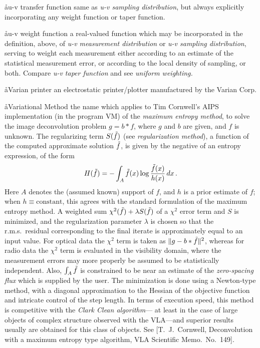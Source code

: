 \aa{u-v transfer function}
same as {\it u-v sampling distribution}\/, but always
explicitly incorporating any \uv weight function or
\uv taper function.

\aa{u-v weight function}
a real-valued function which may be incorporated in the definition, above,
of {\it u-v measurement distribution} or {\it u-v sampling distribution}\/,
serving to
weight each measurement either according to an estimate of the statistical
measurement error,
or according to the local density of sampling, or both.
Compare {\it u-v taper function} and see {\it uniform weighting.}

\aa{Varian printer}
an electrostatic printer\slash plotter manufactured by the Varian Corp.

\aa{Variational Method}
the name which applies to Tim Cornwell's AIPS implementation
(in the program VM) of the {\it maximum entropy method},
to solve the image deconvolution problem $g=b\ast f$,
where $g$ and $b$ are given, and $f$ is unknown.
The regularizing term $S(\tilde f)$ (see {\it regularization method}\/),
a function of the computed approximate solution $\tilde f$,
is given by the negative of an entropy expression, of the form
$$H(\tilde f)=-\int_A\tilde f(x)\log{\tilde f(x)\over h(x)}\,dx\,.$$
Here $A$ denotes the (assumed known) support of $f$,
and $h$ is a prior estimate of $f$;
when $h\equiv\text{constant}$, this agrees with the standard formulation
of the maximum entropy method.
A weighted sum $\chi^2(\tilde f)+\lambda S(\tilde f)$
of a $\chi^2$ error term and $S$ is minimized,
and the regularization parameter $\lambda$ is chosen so that the
r.m.s.\ residual corresponding to the final iterate
is approximately equal to an input value.
For optical data the $\chi^2$ term is taken as $\|g-b\ast\tilde f\|^2$,
whereas for radio data the $\chi^2$ term is evaluated
in the visibility domain, where the measurement errors
may more properly be assumed to be statistically independent.
Also, $\int_A\tilde f$ is constrained to be near
an estimate of the {\it zero-spacing flux} which is supplied by the user.
The minimization is done using a Newton-type method, with
a diagonal approximation to the Hessian of the objective function
and intricate control of the step length.
In terms of execution speed, this method is competitive
with the {\it Clark Clean algorithm}\/---%
at least in the case of large objects of complex structure observed
with the VLA---and superior results usually are obtained
for this class of objects.
See [T.~J.~Cornwell, Deconvolution with a maximum entropy type
algorithm, VLA Scientific Memo.\ No.~149].

